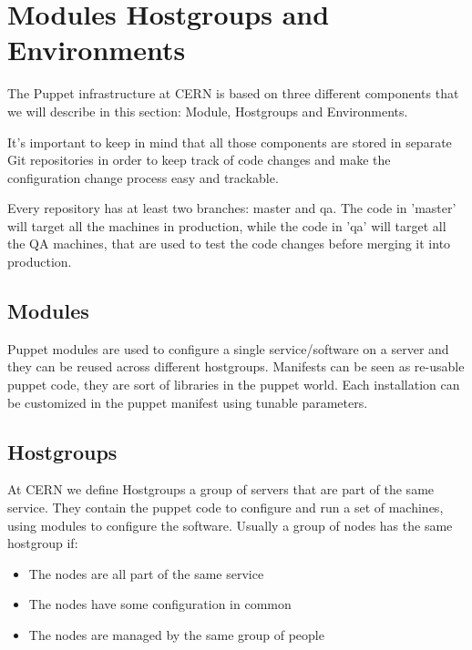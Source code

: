 \section{Modules Hostgroups and Environments}

The Puppet infrastructure at CERN is based on three different components
that we will describe in this section: Module, Hostgroups and
Environments.

It's important to keep in mind that all those components are stored in
separate Git repositories in order to keep track of code changes and make
the configuration change process easy and trackable.

Every repository has at least two branches: master and qa. The code in
'master' will target all the machines in production, while the code in
'qa' will target all the QA machines, that are used to test the code
changes before merging it into production.

\subsection{Modules}

Puppet modules are used to configure a single service/software on a server
and they can be reused across different hostgroups. Manifests can be seen
as re-usable puppet code, they are sort of libraries in the puppet world.
Each installation can be customized in the puppet manifest using tunable
parameters.

\subsection{Hostgroups}

At CERN we define Hostgroups a group of servers that are part of the same
service. They contain the puppet code to configure and run a set of
machines, using modules to configure the software. Usually a group of
nodes has the same hostgroup if:

\begin{itemize}

\item The nodes are all part of the same service

\item The nodes have some configuration in common

\item The nodes are managed by the same group of people

\end{itemize}


